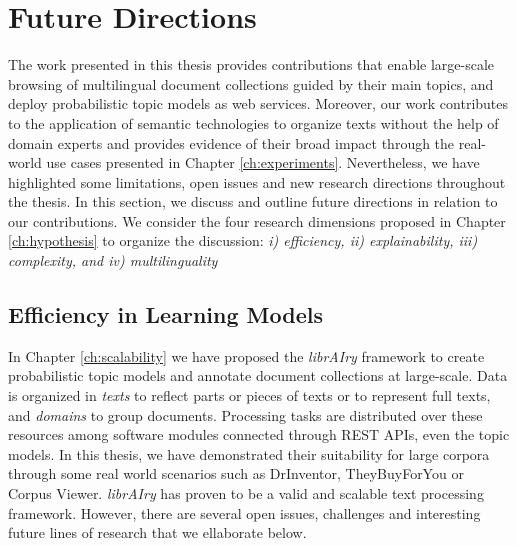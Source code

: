 \section{Future Directions}

The work presented in this thesis provides contributions that enable large-scale browsing of multilingual document collections guided by their main topics, and deploy probabilistic topic models as web services. Moreover, our work contributes to the application of semantic technologies to organize texts without the help of domain experts and provides evidence of their broad impact through the real-world use cases presented in Chapter \ref{ch:experiments}. Nevertheless, we have highlighted some limitations, open issues and new research directions throughout the thesis. In this section, we discuss and outline future directions in relation to our contributions. We consider the four research dimensions proposed in Chapter \ref{ch:hypothesis} to organize the discussion: \textit{i) efficiency, ii) explainability, iii) complexity, and iv) multilinguality}



\subsection{Efficiency in Learning Models}

In Chapter \ref{ch:scalability} we have proposed the \textit{librAIry} framework to create probabilistic topic models and annotate document collections at large-scale. Data is organized in \textit{texts} to reflect parts or pieces of texts or to represent full texts, and \textit{domains} to group documents. Processing tasks are distributed over these resources among software modules connected through REST APIs, even the topic models. In this thesis, we have demonstrated their suitability for large corpora through some real world scenarios such as DrInventor, TheyBuyForYou or Corpus Viewer. \textit{librAIry} has proven to be a valid and scalable text processing framework. However, there are several open issues, challenges and interesting future lines of research that we ellaborate below.


